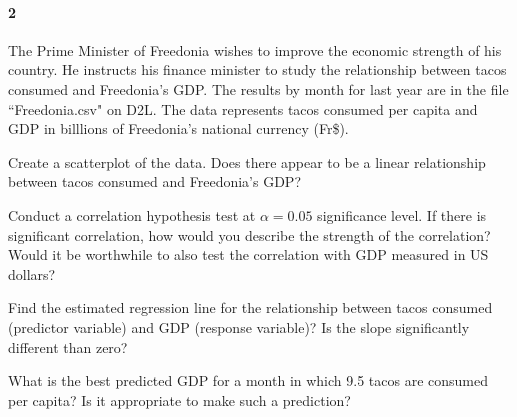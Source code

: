 \documentclass{article}
\begin{document}
\begin{flushleft}
\paragraph{2} The Prime Minister of Freedonia wishes to improve the economic strength of his country. He instructs his finance minister to study the relationship between tacos consumed and Freedonia's GDP. The results by month for last year are in the file ``Freedonia.csv" on D2L. The data represents tacos consumed per capita and GDP in billlions of Freedonia's national currency (Fr\$).
\begin{enumalpha}
\item Create a scatterplot of the data. Does there appear to be a linear relationship between tacos consumed and Freedonia's GDP?
\vspace{1.6in}
\item Conduct a correlation hypothesis test at $\alpha = 0.05$ significance level. If there is significant correlation, how would you describe the strength of the correlation? Would it be worthwhile to also test the correlation with GDP measured in US dollars?
\vspace{1.6in}
\item Find the estimated regression line for the relationship between tacos consumed (predictor variable) and GDP (response variable)? Is the slope significantly different than zero?
\vspace{1.6in}
\item What is the best predicted GDP for a month in which 9.5 tacos are consumed per capita? Is it appropriate to make such a prediction?
\end{enumalpha}

\newpage

\end{flushleft}
\end{document}
